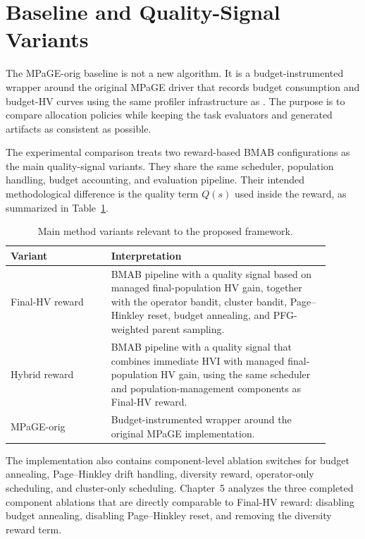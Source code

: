 \section{Baseline and Quality-Signal Variants}

The MPaGE-orig baseline is not a new algorithm. It is a budget-instrumented wrapper around the original MPaGE driver that records budget consumption and budget-HV curves using the same profiler infrastructure as \bmab{}. The purpose is to compare allocation policies while keeping the task evaluators and generated artifacts as consistent as possible.

The experimental comparison treats two reward-based BMAB configurations as the main quality-signal variants. They share the same scheduler, population handling, budget accounting, and evaluation pipeline. Their intended methodological difference is the quality term $Q(s)$ used inside the reward, as summarized in Table~\ref{tab:method-ablation}.

\begin{table}[H]
  \centering
  \caption{Main method variants relevant to the proposed framework.}
  \label{tab:method-ablation}
  \small
  \begin{tabular}{>{\raggedright\arraybackslash}p{0.29\linewidth}>{\raggedright\arraybackslash}p{0.61\linewidth}}
    \toprule
    Variant & Interpretation \\
    \midrule
    Final-HV reward & BMAB pipeline with a quality signal based on managed final-population HV gain, together with the operator bandit, cluster bandit, Page--Hinkley reset, budget annealing, and PFG-weighted parent sampling. \\
    Hybrid reward & BMAB pipeline with a quality signal that combines immediate HVI with managed final-population HV gain, using the same scheduler and population-management components as Final-HV reward. \\
    MPaGE-orig & Budget-instrumented wrapper around the original MPaGE implementation. \\
    \bottomrule
  \end{tabular}
\end{table}

The implementation also contains component-level ablation switches for budget annealing, Page--Hinkley drift handling, diversity reward, operator-only scheduling, and cluster-only scheduling. Chapter~5 analyzes the three completed component ablations that are directly comparable to Final-HV reward: disabling budget annealing, disabling Page--Hinkley reset, and removing the diversity reward term.
